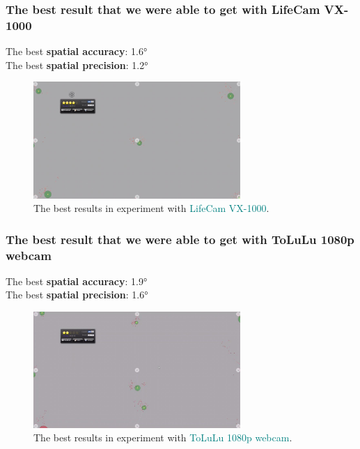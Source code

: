 \documentclass{beamer}
\begin{document}
    \begin{frame}
        \frametitle{The best result that we were able to get with LifeCam VX-1000}

        \center
        The best \textbf{spatial accuracy}: \ang{1.6} \\
        The best \textbf{spatial precision}: \ang{1.2}

        \begin{figure}
            \begin{center}
                \includegraphics[width=0.7\textwidth]{Best_res_VX_1000.jpg}
            \end{center}
            \caption{The best results in experiment with
            \textcolor{teal}{LifeCam VX-1000}.}
            \label{fig:Best_VX}
        \end{figure}

    \end{frame}

    \begin{frame}
        \frametitle{The best result that we were able to get with ToLuLu 1080p
        webcam}

        \center
        The best \textbf{spatial accuracy}: \ang{1.9} \\
        The best \textbf{spatial precision}: \ang{1.6}

        \begin{figure}
            \begin{center}
                \includegraphics[width=0.7\textwidth]{Best_res_Tolulu.jpg}
            \end{center}
            \caption{The best results in experiment with
            \textcolor{teal}{ToLuLu 1080p webcam}.}
            \label{fig:Best_Tolulu}
        \end{figure}

    \end{frame}
\end{document}

